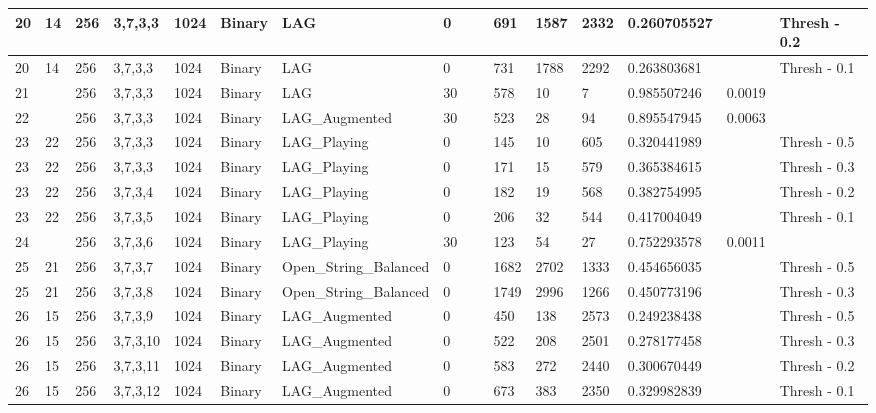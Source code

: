 \documentclass[conference]{IEEEtran}
\begin{document}
\begin{table}[!ht]
\begin{adjustbox}{width=\textwidth}
\begin{tabular}{|l|l|l|l|l|l|l|l|l|l|l|l|l|l|l|}
                20 & 14 & 256 & 3,7,3,3 & 1024 & Binary & LAG & 0 & ~ & 691 & 1587 & 2332 & 0.260705527 & ~ & Thresh - 0.2 \\ \hline
                20 & 14 & 256 & 3,7,3,3 & 1024 & Binary & LAG & 0 & ~ & 731 & 1788 & 2292 & 0.263803681 & ~ & Thresh - 0.1 \\ \hline
                21 & ~ & 256 & 3,7,3,3 & 1024 & Binary & LAG & 30 & ~ & 578 & 10 & 7 & 0.985507246 & 0.0019 & ~ \\ \hline
                22 & ~ & 256 & 3,7,3,3 & 1024 & Binary & LAG\_Augmented & 30 & ~ & 523 & 28 & 94 & 0.895547945 & 0.0063 & ~ \\ \hline
                23 & 22 & 256 & 3,7,3,3 & 1024 & Binary & LAG\_Playing & 0 & ~ & 145 & 10 & 605 & 0.320441989 & ~ & Thresh - 0.5 \\ \hline
                23 & 22 & 256 & 3,7,3,3 & 1024 & Binary & LAG\_Playing & 0 & ~ & 171 & 15 & 579 & 0.365384615 & ~ & Thresh - 0.3 \\ \hline
                23 & 22 & 256 & 3,7,3,4 & 1024 & Binary & LAG\_Playing & 0 & ~ & 182 & 19 & 568 & 0.382754995 & ~ & Thresh - 0.2 \\ \hline
                23 & 22 & 256 & 3,7,3,5 & 1024 & Binary & LAG\_Playing & 0 & ~ & 206 & 32 & 544 & 0.417004049 & ~ & Thresh - 0.1 \\ \hline
                24 & ~ & 256 & 3,7,3,6 & 1024 & Binary & LAG\_Playing & 30 & ~ & 123 & 54 & 27 & 0.752293578 & 0.0011 & ~ \\ \hline
                25 & 21 & 256 & 3,7,3,7 & 1024 & Binary & Open\_String\_Balanced & 0 & ~ & 1682 & 2702 & 1333 & 0.454656035 & ~ & Thresh - 0.5 \\ \hline
                25 & 21 & 256 & 3,7,3,8 & 1024 & Binary & Open\_String\_Balanced & 0 & ~ & 1749 & 2996 & 1266 & 0.450773196 & ~ & Thresh - 0.3 \\ \hline
                26 & 15 & 256 & 3,7,3,9 & 1024 & Binary & LAG\_Augmented & 0 & ~ & 450 & 138 & 2573 & 0.249238438 & ~ & Thresh - 0.5 \\ \hline
                26 & 15 & 256 & 3,7,3,10 & 1024 & Binary & LAG\_Augmented & 0 & ~ & 522 & 208 & 2501 & 0.278177458 & ~ & Thresh - 0.3 \\ \hline
                26 & 15 & 256 & 3,7,3,11 & 1024 & Binary & LAG\_Augmented & 0 & ~ & 583 & 272 & 2440 & 0.300670449 & ~ & Thresh - 0.2 \\ \hline
                26 & 15 & 256 & 3,7,3,12 & 1024 & Binary & LAG\_Augmented & 0 & ~ & 673 & 383 & 2350 & 0.329982839 & ~ & Thresh - 0.1 \\ \hline

\end{tabular}
\end{adjustbox}
\end{table}
\end{document}
